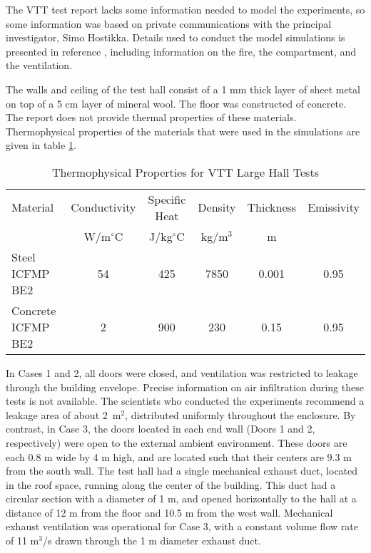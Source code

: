 The VTT test report lacks some information needed to model the experiments, so some information was based on private communications with the principal investigator, Simo Hostikka. Details used to conduct the model simulations is presented in reference \cite{NRCNUREG1824}, including information on the fire, the compartment, and the ventilation.

The walls and ceiling of the test hall consist of a 1 mm thick layer of sheet metal on top of a 5 cm layer of mineral wool. The floor was constructed of concrete. The report does not provide thermal properties of these materials. Thermophysical properties of the materials that were used in the simulations are given in table \ref{tab:VTT_Thermals}.

\begin{table}[h!]
\begin{center}
\caption{Thermophysical Properties for VTT Large Hall Tests}
\label{tab:VTT_Thermals}
\vspace{0.1in}
\begin{tabular}{|l|c|c|c|c|c|}
\hline
Material & Conductivity & Specific Heat & Density & Thickness & Emissivity\\
 & W/m$^{\circ}$C & J/kg$^{\circ}$C & kg/m$^3$ & m & \\ \hline
\hline
Steel ICFMP BE2 & 54 &        425 &       7850 &      0.001 &       0.95  \\ \hline
Concrete ICFMP BE2 &          2 &        900 &        230 &       0.15 &       0.95 \\ \hline
\end{tabular}
\end{center}
\end{table}

In Cases 1 and 2, all doors were closed, and ventilation was restricted to leakage through the building envelope. Precise information on air infiltration during these tests is not available. The scientists who conducted the experiments recommend a leakage area of about 2~m$^2$, distributed uniformly throughout the enclosure. By contrast, in Case 3, the doors located in each end wall (Doors 1 and 2, respectively) were open to the external ambient environment. These doors are each 0.8 m wide by 4 m high, and are located such that their centers are 9.3 m from the south wall. The test hall had a single mechanical exhaust duct, located in the roof space, running along the center of the building. This duct had a circular section with a diameter of 1 m, and opened horizontally to the hall at a distance of 12 m from the floor and 10.5 m from the west wall. Mechanical exhaust ventilation was operational for Case 3, with a constant volume flow rate of 11 m$^3$/s drawn through the 1 m diameter exhaust duct.

